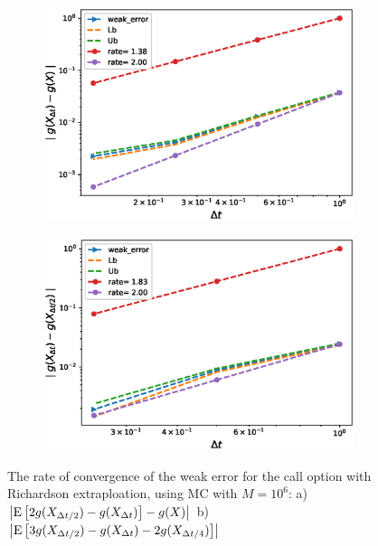 \documentclass[11pt]{article}
\newcommand{\expt}[1]{\mathrm{E}\left[#1\right]}
\begin{document}
\begin{figure}[h!]
	\centering
	\begin{subfigure}{.4\textwidth}
		\centering
		\includegraphics[width=1\linewidth]{./figures/weak_error_rates_call/Beta_10/with_richardson/weak_convergence_order_call_richardson_relative_M_10_6}
		\caption{}
		\label{fig:sub3}
	\end{subfigure}%
	\begin{subfigure}{.4\textwidth}
		\centering
		\includegraphics[width=1\linewidth]{./figures/weak_error_rates_call/Beta_10/with_richardson/weak_convergence_order_differences_call_richardson_relative_M_10_6}
		\caption{}
		\label{fig:sub4}
	\end{subfigure}
	
	\caption{The rate of convergence of the weak error for the  call option with Richardson extraploation, using MC with $M=10^6$: a) $\abs{\expt{2 g(X_{\Delta t/2}) -g(X_{\Delta t})}-g(X)}$  b) $\abs{\expt{3 g(X_{\Delta t/2})-g(X_{\Delta t})-2 g(X_{\Delta t/4})}}$ }
	\label{fig:fig:Weak_rate_call_with_rich}
\end{figure}
\end{document}
